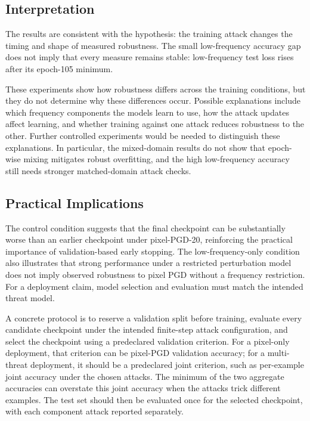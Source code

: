 \documentclass{article}
\begin{document}
\subsection{Interpretation}
The results are consistent with the hypothesis: the training attack changes
the timing and shape of measured robustness. The small low-frequency accuracy
gap does not imply that every
measure remains stable: low-frequency test loss rises after its epoch-105
minimum.

These experiments show how robustness differs across the training conditions,
but they do not determine why these differences occur. Possible explanations
include which frequency components the models learn to use, how the attack
updates affect learning, and whether training against one attack reduces
robustness to the other. Further controlled experiments would be needed to
distinguish these explanations. In particular, the
mixed-domain results do not show that epoch-wise mixing mitigates robust
overfitting, and the high low-frequency accuracy still needs stronger
matched-domain attack checks.

\subsection{Practical Implications}
The control condition suggests that the final checkpoint can be substantially
worse than an earlier checkpoint under pixel-PGD-20, reinforcing the practical
importance of validation-based early stopping. The low-frequency-only condition
also illustrates that strong performance under a restricted perturbation model
does not imply observed robustness to pixel PGD without a frequency
restriction. For a deployment
claim, model selection and evaluation must match the intended threat model.

A concrete protocol is to reserve a validation split before training, evaluate
every candidate checkpoint under the intended finite-step attack configuration,
and select the checkpoint using a predeclared validation criterion. For a
pixel-only deployment, that criterion can be pixel-PGD validation accuracy;
for a multi-threat deployment, it should be a predeclared joint criterion,
such as per-example joint accuracy under the chosen attacks. The
minimum of the two aggregate accuracies can overstate this joint accuracy
when the attacks trick different examples. The test set should then be evaluated
once
for the selected checkpoint, with each component attack reported separately.
\end{document}
